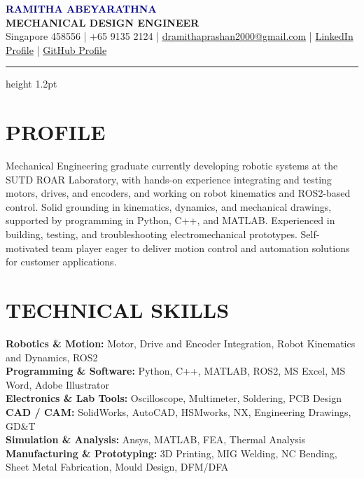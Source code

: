 \documentclass[10pt,a4paper]{article}
\begin{document}
\begin{center}
    {\LARGE \textbf{\textcolor{navy}{RAMITHA ABEYARATHNA}}}\\[3pt]
    {\bfseries MECHANICAL DESIGN ENGINEER}\\[5pt]
    \small
    Singapore 458556 \;|\; +65 9135 2124 \;|\;
    \href{mailto:dramithaprashan2000@gmail.com}{dramithaprashan2000@gmail.com} \;|\;
    \href{https://www.linkedin.com/in/ramitha-abeyarathna-830b50217/}{LinkedIn Profile} \;|\;
    \href{https://github.com/RamithaPrasan2000}{GitHub Profile}
\end{center}
\vspace{4pt}
{\color{navy}\hrule height 1.2pt}
\vspace{2pt}

\section{PROFILE}
Mechanical Engineering graduate currently developing robotic systems at the SUTD ROAR Laboratory, with hands-on experience integrating and testing motors, drives, and encoders, and working on robot kinematics and ROS2-based control. Solid grounding in kinematics, dynamics, and mechanical drawings, supported by programming in Python, C++, and MATLAB. Experienced in building, testing, and troubleshooting electromechanical prototypes. Self-motivated team player eager to deliver motion control and automation solutions for customer applications.

\section{TECHNICAL SKILLS}
\textbf{Robotics \& Motion:} Motor, Drive and Encoder Integration, Robot Kinematics and Dynamics, ROS2 \\
\textbf{Programming \& Software:} Python, C++, MATLAB, ROS2, MS Excel, MS Word, Adobe Illustrator \\
\textbf{Electronics \& Lab Tools:} Oscilloscope, Multimeter, Soldering, PCB Design \\
\textbf{CAD / CAM:} SolidWorks, AutoCAD, HSMworks, NX, Engineering Drawings, GD\&T \\
\textbf{Simulation \& Analysis:} Ansys, MATLAB, FEA, Thermal Analysis \\
\textbf{Manufacturing \& Prototyping:} 3D Printing, MIG Welding, NC Bending, Sheet Metal Fabrication, Mould Design, DFM/DFA
\end{document}

